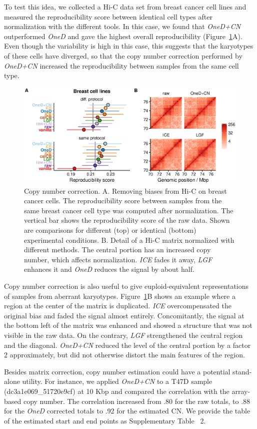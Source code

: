 \documentclass[a4,center,fleqn]{NAR}
\begin{document}
To test this idea, we collected a Hi-C data set from breast cancer cell
lines and measured the reproducibility score between identical cell types
after normalization with the different tools. In this case, we found that
\textit{OneD+CN} outperformed \textit{OneD} and gave the highest overall
reproducibility (Figure~\ref{fig:cnv_correction}A). Even though the
variability is high in this case, this suggests that the karyotypes of
these cells have diverged, so that the copy number correction performed by
\textit{OneD+CN} increased the reproducibility between samples from the same
cell type.

\begin{figure}
\centerline{\includegraphics[width=.49\textwidth]
  {nar_figures/figure_4.eps}}
\caption{Copy number correction. A. Removing biases from Hi-C on breast
cancer cells. The reproducibility score between samples from the same
breast cancer cell type was computed after normalization. The vertical bar
shows the reproducibility score of the raw data. Shown are comparisons for
different (top) or identical (bottom) experimental conditions. B. Detail
of a Hi-C matrix normalized with different methods. The central portion
has an increased copy number, which affects normalization. \textit{ICE}
fades it away, \textit{LGF} enhances it and \textit{OneD} reduces the
signal by about half.}
\label{fig:cnv_correction}
\end{figure}

Copy number correction is also useful to give euploid-equivalent
representations of samples from aberrant karyotypes.
Figure~\ref{fig:cnv_correction}B shows an example where a region at the
center of the matrix is duplicated. \textit{ICE} overcompensated the
original bias and faded the signal almost entirely. Concomitantly, the
signal at the bottom left of the matrix was enhanced and showed a
structure that was not visible in the raw data. On the contrary,
\textit{LGF} strengthened the central region and the diagonal.
\textit{OneD+CN} reduced the level of the central portion by a factor 2
approximately, but did not otherwise distort the main features of the
region.

Besides matrix correction, copy number estimation could have a potential stand-alone
utility. For instance, we applied \textit{OneD+CN} to a T47D sample
(dc3a1e069\_51720e9cf) at 10 Kbp and compared the correlation with the
array-based copy number. The correlation increased from .80 for the raw totals,
to .88 for the \textit{OneD} corrected totals to .92 for the estimated CN. We
provide the table of the estimated start and end points as Supplementary Table~
2.
\end{document}

